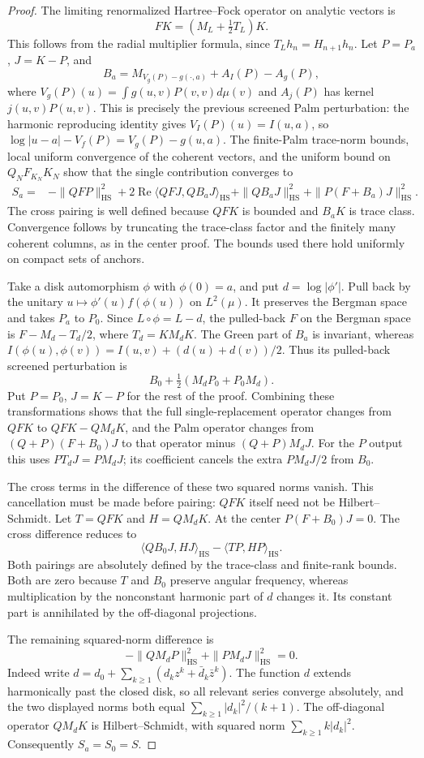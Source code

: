 \documentclass[11pt,a4paper]{article}
\numberwithin{equation}{section}
\theoremstyle{definition}
\theoremstyle{remark}
\begin{document}
\begin{proof}
The limiting renormalized Hartree--Fock operator on analytic vectors
is
\[
 F K=(M_L+\tfrac12T_L)K.
\]
This follows from the radial multiplier formula, since
$T_Lh_n=H_{n+1}h_n$.
Let $P=P_a$, $J=K-P$, and
\[
 B_a=M_{V_g(P)-g(\cdot,a)}+A_I(P)-A_g(P),
\]
where $V_g(P)(u)=\int g(u,v)P(v,v)d\mu(v)$ and
$A_j(P)$ has kernel $j(u,v)P(u,v)$.
This is precisely the previous screened Palm perturbation: the
harmonic reproducing identity gives
$V_I(P)(u)=I(u,a)$, so
$\log|u-a|-V_f(P)=V_g(P)-g(u,a)$.
The finite-Palm trace-norm bounds, local uniform convergence of
the coherent vectors, and the uniform bound on $Q_NF_{K_N}K_N$
show that the single contribution converges to
\begin{align*}
 S_a={}&-\|QFP\|_{\mathrm{HS}}^2
 +2\operatorname{Re}\langle QFJ,QB_aJ\rangle_{\mathrm{HS}}
 +\|QB_aJ\|_{\mathrm{HS}}^2
 +\|P(F+B_a)J\|_{\mathrm{HS}}^2.
\end{align*}
The cross pairing is well defined because $QFK$ is bounded and
$B_aK$ is trace class.  Convergence follows by truncating the
trace-class factor and the finitely many coherent columns, as
in the center proof.  The bounds used there hold uniformly on
compact sets of anchors.

Take a disk automorphism $\phi$ with $\phi(0)=a$, and put
$d=\log|\phi'|$.  Pull back by the unitary
$u\mapsto\phi'(u)f(\phi(u))$ on $L^2(\mu)$.
It preserves the Bergman space and takes $P_a$ to $P_0$.
Since $L\circ\phi=L-d$, the pulled-back $F$ on the Bergman space
is $F-M_d-T_d/2$, where $T_d=KM_dK$.
The Green part of $B_a$ is invariant, whereas
$I(\phi(u),\phi(v))=I(u,v)+(d(u)+d(v))/2$.
Thus its pulled-back screened perturbation is
\[
 B_0+\tfrac12(M_dP_0+P_0M_d).
\]
Put $P=P_0$, $J=K-P$ for the rest of the proof.
Combining these transformations shows that the full
single-replacement operator changes from $QFK$ to
$QFK-QM_dK$, and the Palm operator changes from
$(Q+P)(F+B_0)J$ to that operator minus $(Q+P)M_dJ$.
For the $P$ output this uses $PT_dJ=PM_dJ$; its coefficient
cancels the extra $P M_dJ/2$ from $B_0$.

The cross terms in the difference of these two squared norms
vanish.  This cancellation must be made before pairing: $QFK$
itself need not be Hilbert--Schmidt.  Let $T=QFK$ and $H=QM_dK$.
At the center $P(F+B_0)J=0$.  The cross difference reduces to
\[
 \langle QB_0J,HJ\rangle_{\mathrm{HS}}
                         -\langle TP,HP\rangle_{\mathrm{HS}}.
\]
Both pairings are absolutely defined by the trace-class and
finite-rank bounds.  Both are zero because $T$ and $B_0$ preserve
angular frequency, whereas multiplication by the nonconstant
harmonic part of $d$ changes it.  Its constant part is annihilated
by the off-diagonal projections.

The remaining squared-norm difference is
\[
 -\|QM_dP\|_{\mathrm{HS}}^2+\|PM_dJ\|_{\mathrm{HS}}^2=0.
\]
Indeed write $d=d_0+\sum_{k\ge1}(d_kz^k+\bar d_k\bar z^k)$.
The function $d$ extends harmonically past the closed disk, so
all relevant series converge absolutely, and the two displayed
norms both equal $\sum_{k\ge1}|d_k|^2/(k+1)$.
The off-diagonal operator $QM_dK$ is Hilbert--Schmidt, with
squared norm $\sum_{k\ge1}k|d_k|^2$.
Consequently $S_a=S_0=S$.
\end{proof}
\end{document}
